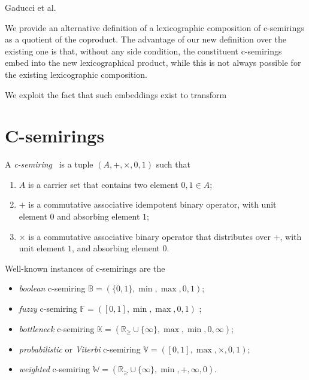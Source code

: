 \documentclass[runningheads]{llncs}
\newcommand{\B}{\mathbb{B}}
\newcommand{\F}{\mathbb{F}}
\newcommand{\K}{\mathbb{K}}
\newcommand{\V}{\mathbb{V}}
\newcommand{\W}{\mathbb{W}}
\newcommand{\ie}{i.e.,\xspace}
\newcommand{\cbot}{0}
\newcommand{\ctop}{1}
\newcommand{\ctimes}{\times}
\newcommand{\cplus}{+}
\begin{document}
Gaducci et al. \cite{GHMW13}

We provide an alternative definition of a lexicographic composition of c-semirings as a quotient of the coproduct. 
The advantage of our new definition over the existing one is that, without any side condition, the constituent c-semirings embed into the new lexicographical product, while this is not always possible for the existing lexicographic composition.

We exploit the fact that such embeddings exist to transform 


\section{C-semirings}
\label{sec:csemirings}


A {\em c-semiring}~\cite{BMR97} is a tuple $(A, \cplus, \ctimes, \cbot, \ctop)$ such that
\begin{enumerate}
    \item $A$ is a carrier set that contains two element $\cbot, \ctop \in A$;
    \item $\cplus$ is a commutative associative idempotent binary operator, with unit element $\cbot$ and absorbing element $\ctop$;
    \item $\ctimes$ is a commutative associative binary operator that distributes over $\cplus$, with unit element $\ctop$, and absorbing element $\cbot$.
\end{enumerate}
Well-known instances of c-semirings are the 
\begin{itemize}
\item {\em boolean} c-semiring $\B = (\{0, 1\}, \min, \max, 0, 1)$;
\item {\em fuzzy} c-semiring $\F= ([0,1],\min, \max, 0, 1)$ ;
\item {\em bottleneck} c-semiring $\K = (\mathbb{R}_{\geq} \cup \{\infty\}, \max, \min, 0, \infty)$;
\item {\em probabilistic} or {\em Viterbi} c-semiring $\V = ([0,1], \max, \times, 0, 1)$; 
\item {\em weighted} c-semiring $\W = (\mathbb{R}_{\geq} \cup\{\infty\}, \min, +, \infty, 0).$
\end{itemize}
\end{document}
